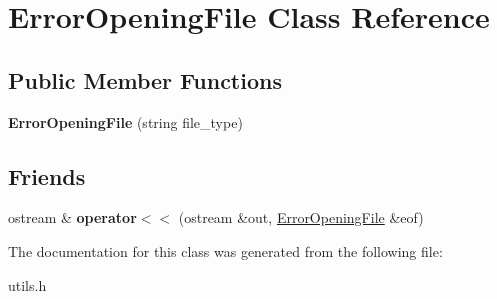 \hypertarget{class_error_opening_file}{}\section{Error\+Opening\+File Class Reference}
\label{class_error_opening_file}
\subsection*{Public Member Functions}
\begin{DoxyCompactItemize}
\item 
\hypertarget{class_error_opening_file_a1e5ab065abd8e5cfa827730f9e9b06d4}{}\label{class_error_opening_file_a1e5ab065abd8e5cfa827730f9e9b06d4} 
{\bfseries Error\+Opening\+File} (string file\+\_\+type)
\end{DoxyCompactItemize}
\subsection*{Friends}
\begin{DoxyCompactItemize}
\item 
\hypertarget{class_error_opening_file_af72ed5066b7bbfc4485454291cb5356c}{}\label{class_error_opening_file_af72ed5066b7bbfc4485454291cb5356c} 
ostream \& {\bfseries operator$<$$<$} (ostream \&out, \hyperlink{class_error_opening_file}{Error\+Opening\+File} \&eof)
\end{DoxyCompactItemize}


The documentation for this class was generated from the following file\+:\begin{DoxyCompactItemize}
\item 
utils.\+h\end{DoxyCompactItemize}
